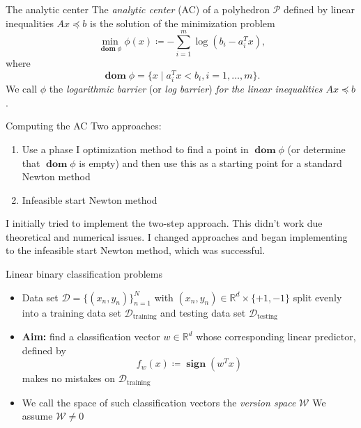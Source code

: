 \documentclass[pdf, 12pt]
{beamer}
\theoremstyle{definition}
\theoremstyle{remark}
\newcommand{\transpose}{T}
\DeclareMathOperator{\domain}{\textbf{dom}}
\DeclareMathOperator{\sign}{\textbf{sign}}
\begin{document}
\begin{frame}{The analytic center}
        The \emph{analytic center} (AC) of a polyhedron $\mathcal{P}$ defined by linear inequalities $Ax \preceq b$ is the solution of the minimization problem
        \begin{equation*}
            \min_{\domain \phi} \phi(x) \coloneqq - \sum_{i=1}^{m}{\log{(b_i - a_i^\transpose x)}},
        \end{equation*}        
        where
        \begin{equation*}
            \domain \phi = \{x \;|\; a_i^\transpose x < b_i, i = 1, \dots, m\}.
        \end{equation*}
        We call $\phi$ the \emph{logarithmic barrier} (or \emph{log barrier}) \emph{for the linear inequalities $Ax \preceq b$}.
      
\end{frame}

\begin{frame}{Computing the AC}
      Two approaches:
      \begin{enumerate}
            \item Use a phase I optimization method to find a point in $\domain \phi$ (or determine that $\domain \phi$ is empty) and then use this as a starting point for a standard Newton method
            \item Infeasible start Newton method  
      \end{enumerate}

      I initially tried to implement the two-step approach. This didn't work due  theoretical and numerical issues. I changed approaches and began implementing to the infeasible start Newton method, which was successful.
\end{frame}

\begin{frame}{Linear binary classification problems}
      \begin{itemize}
            \item Data set $\mathcal{D} = \{(x_n, y_n)\}_{n=1}^N$ with $(x_n, y_n) \in \mathbb{R}^d \times \{+1, -1\}$ split evenly into a training data set $\mathcal{D}_\text{training}$ and testing data set $\mathcal{D}_\text{testing}$
            \item \textbf{Aim:} find a classification vector $w \in \mathbb{R}^d$ whose corresponding linear predictor, defined by
        \begin{equation*}
            f_w(x) \coloneqq \sign(w^\transpose x) 
        \end{equation*}
        makes no mistakes on $\mathcal{D}_\text{training}$
            \item We call the space of such classification vectors the \emph{version space} $\mathcal{W}$ We assume $\mathcal{W} \neq 0$
      \end{itemize}


\end{frame}
\end{document}
